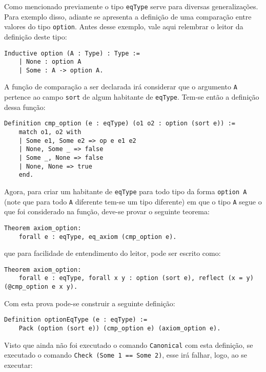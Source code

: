 Como mencionado previamente o tipo \lstinline[language = coq]$eqType$ serve para diversas generalizações. Para exemplo disso, adiante se apresenta a definição de uma comparação entre valores do tipo \lstinline[language = coq]$option$. Antes desse exemplo, vale aqui relembrar o leitor da definição deste tipo:
    \begin{lstlisting}[language = coq,frame=single,tabsize=1]
Inductive option (A : Type) : Type :=
    | None : option A
    | Some : A -> option A.
    \end{lstlisting}
A função de comparação a ser declarada irá considerar que o argumento \lstinline[language = coq]$A$ pertence ao campo \lstinline[language = coq]$sort$ de algum habitante de \lstinline[language = coq]$eqType$. Tem-se então a definição dessa função:
    \begin{lstlisting}[language = coq,frame=single,tabsize=1]
Definition cmp_option (e : eqType) (o1 o2 : option (sort e)) :=
    match o1, o2 with
    | Some e1, Some e2 => op e e1 e2
    | None, Some _ => false
    | Some _, None => false
    | None, None => true
    end.
    \end{lstlisting}
Agora, para criar um habitante de \lstinline[language = coq]$eqType$ para todo tipo da forma \lstinline[language = coq]$option A$ (note que para todo \lstinline[language = coq]$A$ diferente tem-se um tipo diferente) em que o tipo \lstinline[language = coq]$A$ segue o que foi considerado na função, deve-se provar o seguinte teorema:
    \begin{lstlisting}[language = coq,frame=single,tabsize=1]
Theorem axiom_option: 
    forall e : eqType, eq_axiom (cmp_option e).
    \end{lstlisting}
que para facilidade de entendimento do leitor, pode ser escrito como:
    \begin{lstlisting}[language = coq,frame=single,tabsize=1]
Theorem axiom_option: 
    forall e : eqType, forall x y : option (sort e), reflect (x = y) (@cmp_option e x y).
    \end{lstlisting}
Com esta prova pode-se construir a seguinte definição:
    \begin{lstlisting}[language = coq,frame=single,tabsize=1]
Definition optionEqType (e : eqType) := 
    Pack (option (sort e)) (cmp_option e) (axiom_option e).
    \end{lstlisting}
Visto que ainda não foi executado o comando \lstinline[language = coq]$Canonical$ com esta definição, se executado o comando \lstinline[language = coq]$Check (Some 1 == Some 2)$, esse irá falhar, logo, ao se executar:
